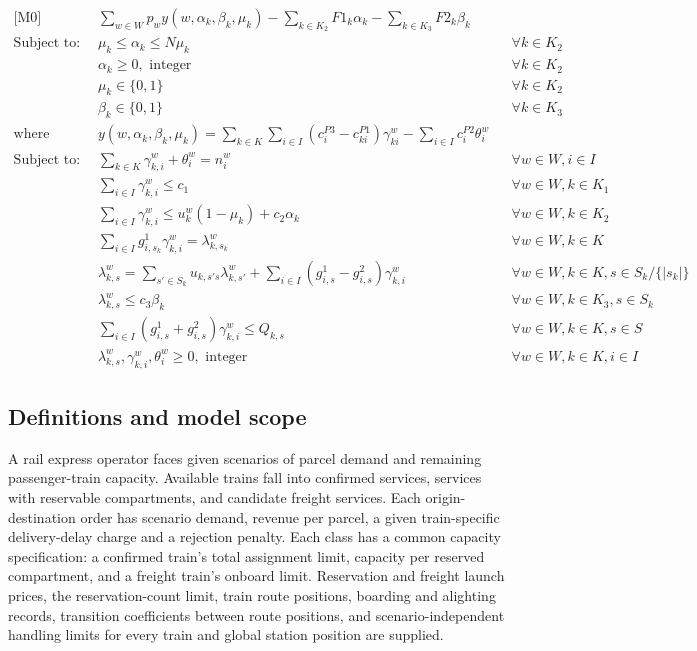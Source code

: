 \documentclass[10pt]{article}
\begin{document}
\begin{align*}
\text{[M0] Maximize} \quad & \sum_{w \in W} p_w y(w, \alpha_k, \beta_k, \mu_k) - \sum_{k \in K_2} F1_k \alpha_k - \sum_{k \in K_3} F2_k \beta_k \tag{1} \\
\text{Subject to:} \quad & \mu_k \le \alpha_k \le N \mu_k && \forall k \in K_2 \tag{2} \\
& \alpha_k \geq 0, \text{ integer} && \forall k \in K_2 \tag{3} \\
& \mu_k \in \{0, 1\} && \forall k \in K_2 \tag{4} \\
& \beta_k \in \{0, 1\} && \forall k \in K_3 \tag{5} \\
\text{where} \quad & y(w, \alpha_k, \beta_k, \mu_k) = \sum_{k \in K} \sum_{i \in I} (c^{P3}_i - c^{P1}_{ki}) \gamma^w_{ki} - \sum_{i \in I} c^{P2}_i \theta^w_i \tag{6} \\
\text{Subject to:} \quad & \sum_{k \in K} \gamma^w_{k,i} + \theta^w_i = n^w_i && \forall w \in W, i \in I \tag{7} \\
& \sum_{i \in I} \gamma^w_{k,i} \le c_1 && \forall w \in W, k \in K_1 \tag{8} \\
& \sum_{i \in I} \gamma^w_{k,i} \le u^w_k (1 - \mu_k) + c_2 \alpha_k && \forall w \in W, k \in K_2 \tag{9} \\
& \sum_{i \in I} g^1_{i,s_k} \gamma^w_{k,i} = \lambda^w_{k,s_k} && \forall w \in W, k \in K \tag{10} \\
& \lambda^w_{k,s} = \sum_{s' \in S_k} u_{k,s's} \lambda^w_{k,s'} + \sum_{i \in I} (g^1_{i,s} - g^2_{i,s}) \gamma^w_{k,i} && \forall w \in W, k \in K, s \in S_k / \{|s_k|\} \tag{11} \\
& \lambda^w_{k,s} \le c_3 \beta_k && \forall w \in W, k \in K_3, s \in S_k \tag{12} \\
& \sum_{i \in I} (g^1_{i,s} + g^2_{i,s}) \gamma^w_{k,i} \le Q_{k,s} && \forall w \in W, k \in K, s \in S \tag{13} \\
& \lambda^w_{k,s}, \gamma^w_{k,i}, \theta^w_i \ge 0, \text{ integer} && \forall w \in W, k \in K, i \in I \tag{14}
\end{align*}

\subsection*{Definitions and model scope}
A rail express operator faces given scenarios of parcel demand and remaining passenger-train capacity. Available trains fall into confirmed services, services with reservable compartments, and candidate freight services. Each origin-destination order has scenario demand, revenue per parcel, a given train-specific delivery-delay charge and a rejection penalty. Each class has a common capacity specification: a confirmed train's total assignment limit, capacity per reserved compartment, and a freight train's onboard limit. Reservation and freight launch prices, the reservation-count limit, train route positions, boarding and alighting records, transition coefficients between route positions, and scenario-independent handling limits for every train and global station position are supplied.
\end{document}
